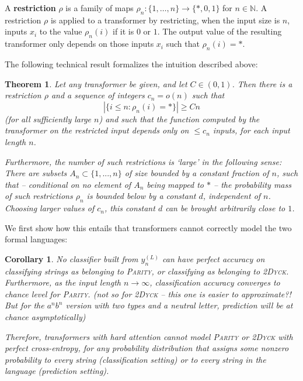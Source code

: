 \documentclass[11pt,a4paper]{article}
\newcounter{theorem}
\newtheorem{corollary}[theorem]{Corollary}
\newtheorem{thm}[theorem]{Theorem}
\newcommand{\key}[1]{\textbf{#1}}
\begin{document}
A \key{restriction} $\rho$ is a family of maps $\rho_n : \{1, \dots, n\} \rightarrow \{*, 0, 1\}$ for $n \in \mathbb{N}$.
A restriction $\rho$ is applied to a transformer by restricting, when the input size is $n$, inputs $x_i$ to the value $\rho_n(i)$ if it is $0$ or $1$.
The output value of the resulting transformer only depends on those inputs $x_i$ such that $\rho_n(i) = *$.

The following technical result formalizes the intuition described above:
\begin{thm}\label{thm:hardmax-main}
Let any transformer be given, and let $C \in (0,1)$.
Then there is a restriction $\rho$ and a sequence of integers $c_n = o(n)$ such that 
$$|\{i \leq n: \rho_n(i) = *\}| \geq Cn$$
(for all sufficiently large $n$) and such that the function computed by the transformer on the restricted input depends only on $\leq c_n$ inputs, for each input length $n$.

Furthermore, the number of such restrictions is `large' in the following sense:
There are subsets $A_n \subset \{1, ..., n\}$ of size bounded by a constant fraction of $n$, such that -- conditional on no element of $A_n$ being mapped to $*$ -- the probability mass of such restrictions $\rho_n$ is bounded below by a constant $d$, independent of $n$.
Choosing larger values of $c_n$, this constant $d$ can be brought arbitrarily close to $1$.
\end{thm}
We first show how this entails that transformers cannot correctly model the two formal languages:
\begin{corollary}
No classifier built from $y_n^{(L)}$ can have perfect accuracy on classifying strings as belonging to \textsc{Parity}, or classifying as belonging to \textsc{2Dyck}.
Furthermore, as the input length $n \rightarrow \infty$, classification accuracy converges to chance level for \textsc{Parity}. (not so for \textsc{2Dyck} -- this one is easier to approximate?! But for the $a^nb^n$ version with two types and a neutral letter, prediction will be at chance asymptotically)

Therefore, transformers with hard attention cannot model \textsc{Parity} or \textsc{2Dyck} with perfect cross-entropy, for \emph{any} probability distribution that assigns some nonzero probability to every string (classification setting) or to every string in the language (prediction setting).
\end{corollary}
\end{document}
